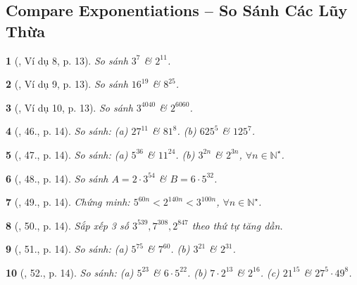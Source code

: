 \documentclass{article}
\newtheorem{baitoan}{}
\begin{document}

\subsection{Compare Exponentiations -- So Sánh Các Lũy Thừa}

\begin{baitoan}[\cite{Tuyen_Toan_6}, Ví dụ 8, p. 13]
	So sánh $3^7$ \& $2^{11}$.
\end{baitoan}

\begin{baitoan}[\cite{Tuyen_Toan_6}, Ví dụ 9, p. 13]
	So sánh $16^{19}$ \& $8^{25}$.
\end{baitoan}

\begin{baitoan}[\cite{Tuyen_Toan_6}, Ví dụ 10, p. 13]
	So sánh $3^{4040}$ \& $2^{6060}$.
\end{baitoan}

\begin{baitoan}[\cite{Tuyen_Toan_6}, 46., p. 14]
	So sánh: (a) $27^{11}$ \& $81^8$. (b) $625^5$ \& $125^7$.
\end{baitoan}

\begin{baitoan}[\cite{Tuyen_Toan_6}, 47., p. 14]
	So sánh: (a) $5^{36}$ \& $11^{24}$. (b) $3^{2n}$ \& $2^{3n}$, $\forall n\in\mathbb{N}^\star$.
\end{baitoan}

\begin{baitoan}[\cite{Tuyen_Toan_6}, 48., p. 14]
	So sánh $A = 2\cdot3^{54}$ \& $B = 6\cdot5^{32}$.
\end{baitoan}

\begin{baitoan}[\cite{Tuyen_Toan_6}, 49., p. 14]
	Chứng minh: $5^{60n} < 2^{140n} < 3^{100n}$, $\forall n\in\mathbb{N}^\star$.
\end{baitoan}

\begin{baitoan}[\cite{Tuyen_Toan_6}, 50., p. 14]
	Sắp xếp 3 số $3^{539},7^{308},2^{847}$ theo thứ tự tăng dần.
\end{baitoan}

\begin{baitoan}[\cite{Tuyen_Toan_6}, 51., p. 14]
	So sánh: (a) $5^{75}$ \& $7^{60}$. (b) $3^{21}$ \& $2^{31}$.
\end{baitoan}

\begin{baitoan}[\cite{Tuyen_Toan_6}, 52., p. 14]
	So sánh: (a) $5^{23}$ \& $6\cdot5^{22}$. (b) $7\cdot2^{13}$ \& $2^{16}$. (c) $21^{15}$ \& $27^5\cdot49^8$.
\end{baitoan}
\end{document}

